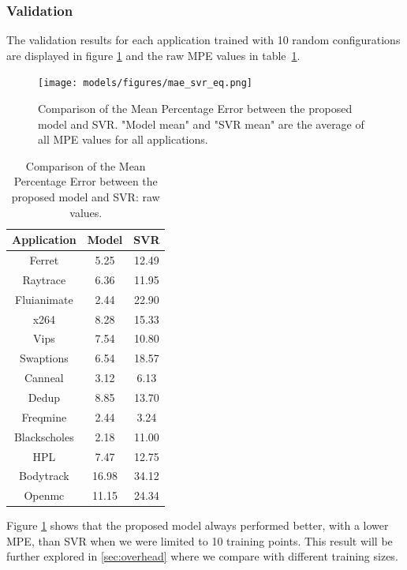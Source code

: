 \subsubsection{Validation}
The validation results for each application trained with 10 random configurations are displayed in figure \ref{fig:mpe_svr_eq} and the raw MPE values in  table~\ref{tab:mpe_svr_eq}.
\begin{figure}[htb!]
	\texttt{[image: models/figures/mae\_svr\_eq.png]}
	\caption{Comparison of the Mean Percentage Error between the proposed model and SVR. "Model mean" and "SVR mean" are the average of all MPE values for all applications.
	}
	\label{fig:mpe_svr_eq}
\end{figure}
\begin{table}[htb!]
	\centering
	\begin{tabular}{|c|c|c|}
		\hline
		Application  & Model & SVR   \\ \hline
		Ferret       & 5.25     & 12.49  \\ \hline
		Raytrace     & 6.36     & 11.95  \\ \hline
		Fluianimate  & 2.44     & 22.90  \\ \hline
		x264         & 8.28     & 15.33  \\ \hline
		Vips         & 7.54     & 10.80  \\ \hline
		Swaptions    & 6.54     & 18.57  \\ \hline
		Canneal      & 3.12     & 6.13   \\ \hline
		Dedup        & 8.85     & 13.70  \\ \hline
		Freqmine     & 2.44     & 3.24   \\ \hline
		Blackscholes & 2.18     & 11.00  \\ \hline
		HPL          & 7.47     & 12.75  \\ \hline
		Bodytrack    & 16.98    & 34.12  \\ \hline
		Openmc       & 11.15    & 24.34  \\ \hline
	\end{tabular}
	\caption{Comparison of the Mean Percentage Error between the proposed model and SVR: raw values.}
	\label{tab:mpe_svr_eq}
\end{table}

Figure \ref{fig:mpe_svr_eq} shows that the proposed model always performed better, with a lower MPE, than SVR when we were limited to 10 training points. This result will be further explored in \cref{sec:overhead} where we compare with different training sizes.

